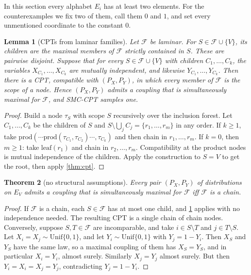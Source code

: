 \documentclass[11pt]{article}
\newtheorem{theorem}{Theorem}[section]
\newtheorem{lemma}[theorem]{Lemma}
\theoremstyle{definition}
\newcommand{\Var}{V}
\newcommand{\F}{\mathcal{F}}
\begin{document}
In this section every alphabet $E_i$ has at least two elements. For the
counterexamples we fix two of them, call them $0$ and $1$, and set every
unmentioned coordinate to the constant $0$.

\begin{lemma}[CPTs from laminar families]\label{lem:laminar-cpt}
Let $\F$ be laminar. For $S\in\F\cup\{\Var\}$, its \emph{children} are the
maximal members of $\F$ strictly contained in $S$. These are pairwise disjoint.
Suppose that for every $S\in\F\cup\{\Var\}$ with children $C_1,\dots,C_k$, the
variables $X_{C_1},\dots,X_{C_k}$ are mutually independent, and likewise
$Y_{C_1},\dots,Y_{C_k}$. Then there is a CPT, compatible with $(P_X,P_Y)$, in which
every member of $\F$ is the scope of a node. Hence $(P_X,P_Y)$ admits a
coupling that is simultaneously maximal for $\F$, and SMC-CPT samples one.
\end{lemma}
\begin{proof}
Build a node $\tau_S$ with scope $S$ recursively over the inclusion forest. Let
$C_1,\dots,C_k$ be the children of $S$ and $S\setminus\bigcup_jC_j=\{r_1,\dots,r_m\}$
in any order. If $k\ge1$, take
$\mathrm{prod}(\cdots\mathrm{prod}(\tau_{C_1},\tau_{C_2})\cdots,\tau_{C_k})$ and
then chain in $r_1,\dots,r_m$. If $k=0$, then $m\ge1$: take $\mathrm{leaf}(r_1)$
and chain in $r_2,\dots,r_m$. Compatibility at the product nodes is mutual
independence of the children. Apply the construction to $S=\Var$ to get the
root, then apply \cref{thm:cpt}.
\end{proof}

\begin{theorem}[no structural assumptions]\label{thm:char-general}
Every pair $(P_X,P_Y)$ of distributions on $E_\Var$ admits a coupling that is
simultaneously maximal for $\F$ iff $\F$ is a chain.
\end{theorem}
\begin{proof}
If $\F$ is a chain, each $S\in\F$ has at most one child, and
\cref{lem:laminar-cpt} applies with no independence needed. The resulting CPT
is a single chain of chain nodes. Conversely, suppose $S,T\in\F$ are
incomparable, and take $i\in S\setminus T$ and $j\in T\setminus S$. Let
$X_i=X_j\sim\mathrm{Unif}\{0,1\}$, and let $Y_i\sim\mathrm{Unif}\{0,1\}$ with
$Y_j=1-Y_i$. Then $X_S$ and $Y_S$ have the same law, so a maximal coupling of
them has $X_S=Y_S$, and in particular $X_i=Y_i$, almost surely. Similarly
$X_j=Y_j$ almost surely. But then $Y_i=X_i=X_j=Y_j$, contradicting $Y_j=1-Y_i$.
\end{proof}
\end{document}
